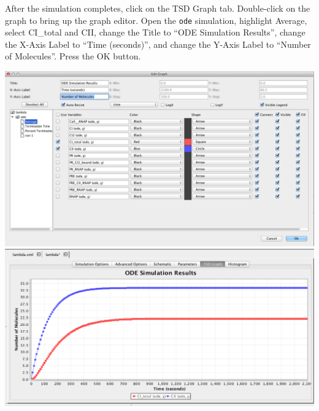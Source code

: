 \documentclass[titlepage,11pt]{article}
\begin{document}
After the simulation completes, click on the TSD Graph tab.  Double-click on the graph to bring up the graph editor.  Open the {\tt ode} simulation, highlight Average, select CI\_total and CII, change the Title to ``ODE Simulation Results'', change the X-Axis Label to ``Time (seconds)'', and change the Y-Axis Label to ``Number of Molecules''.  
Press the OK button.  

\begin{center}
\includegraphics[width=160mm]{screenshots/odeResults}\\
\includegraphics[width=160mm]{screenshots/odeSimResults}
\end{center}
\end{document}
